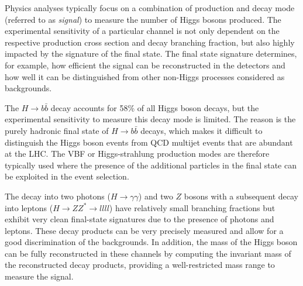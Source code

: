 Physics analyses typically focus on a combination of production and decay mode (referred to as \emph{signal}) to measure the number of Higgs bosons produced. The experimental sensitivity of a particular channel is not only dependent on the respective production cross section and decay branching fraction, but also highly impacted by the signature of the final state. The final state signature determines, for example, how efficient the signal can be reconstructed in the detectors and how well it can be distinguished from other non-Higgs processes considered as backgrounds. 

The $H\rightarrow b\bar{b}$ decay accounts for 58\% of all Higgs boson decays, but the experimental sensitivity to measure this decay mode is limited. The reason is the purely hadronic final state of $H\rightarrow b\bar{b}$ decays, which makes it difficult to distinguish the Higgs boson events from QCD multijet events that are abundant at the LHC.
The VBF or Higgs-strahlung production modes are therefore typically used where the presence of the additional particles in the final state can be exploited in the event selection.

The decay into two photons ($H \to \gamma\gamma$) and two $Z$ bosons with a subsequent decay into leptons ($H \to ZZ^* \to llll$) have relatively small branching fractions but exhibit very clean final-state signatures due to the presence of photons and leptons. These decay products can be very precisely measured and allow for a good discrimination of the backgrounds.
In addition, the mass of the Higgs boson can be fully reconstructed in these channels by computing the invariant mass of the reconstructed decay products, providing a well-restricted mass range to measure the signal.


